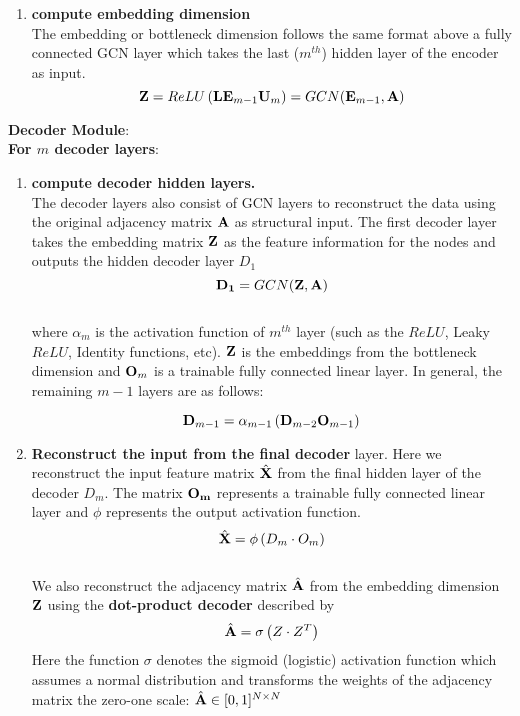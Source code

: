 \documentclass[a4paper,12pt]{article}
\newcommand{\forceindent}{\leavevmode{\parindent=2em\indent}}
\begin{document}
\begin{itemize}
\begin{enumerate}
{\begin{enumerate}
				\item[]{\textbf{compute embedding dimension} \\
					The embedding or bottleneck dimension follows the same format above a fully connected GCN layer which takes the last ($m^{th}$) hidden layer of the encoder as input.
					\[ {\bf Z} = ReLU\left(\mathit{\bf L}{\bf E}_{m-1}{\bf U}_{m}\right) = GCN({\bf E}_{m-1}, {\bf A}) \]} 
			\end{enumerate}
			\forceindent \textbf{Decoder Module}: \\
			\forceindent \textbf{For $m$ decoder layers}:
			\begin{enumerate}
				\item[]{\textbf{compute decoder hidden layers.}\\
					The decoder layers also consist of GCN layers to reconstruct the data using the original adjacency matrix ${\bf A}$ as structural input. The first decoder layer takes the embedding matrix $\bf Z$ as the feature information for the nodes and outputs the hidden decoder layer $D_1$ 
					\[ {\bf D_1} = GCN({\bf Z}, {\bf A})\]
					\\
					where $\alpha_m$ is the activation function of $m^{th}$ layer (such as the $ReLU$, Leaky $ReLU$, Identity functions, etc). $\bf Z$ is the embeddings from the bottleneck dimension and ${\bf O}_m$ is a trainable fully connected linear layer. In general, the remaining $m-1$ layers are as follows:
					
					\[{\bf D}_{m-1} = \alpha_{m-1}\left({\bf D}_{m-2}{\bf O}_{m-1}\right)\]}
				
				\item[]{\textbf{Reconstruct the input from the final decoder} layer. Here we reconstruct the input feature matrix $\hat{\bf X}$ from the final hidden layer of the decoder $D_m$. The matrix ${\bf O_m}$ represents a trainable fully connected linear layer and $\phi$ represents the output activation function. 
					\[\hat{\bf X} = \phi\left(D_m\cdot O_m\right)\]
					\\
					We also reconstruct the adjacency matrix $\hat{\bf A}$ from the embedding dimension $\bf Z$ using the \textbf{dot-product decoder} described by \cite{kipf2016variational,zhou2023community}
					\[\hat{\bf A} = \sigma\left(Z\cdot Z^T\right) \]
					Here the function $\sigma$ denotes the sigmoid (logistic) activation function which assumes a normal distribution and transforms the weights of the adjacency matrix the zero-one scale: $\hat{\bf A} \in [0,1]^{N\times N}$
				}
					

\end{enumerate}}
\end{enumerate}
\end{itemize}
\end{document}
